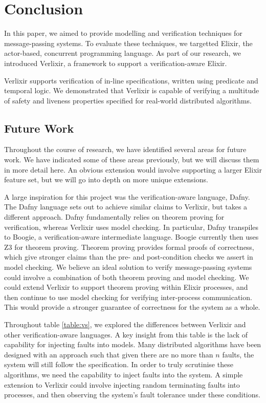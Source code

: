 \chapter{Conclusion}
In this paper, we aimed to provide modelling and verification techniques for message-passing systems. To evaluate these techniques, we targetted Elixir, the actor-based, concurrent programming language. As part of our research, we introduced Verlixir, a framework to support a verification-aware Elixir.
\par
Verlixir supports verification of in-line specifications, written using predicate and temporal logic. We demonstrated that Verlixir is capable of verifying a multitude of safety and liveness properties specified for real-world distributed algorithms. 
\section{Future Work}
Throughout the course of research, we have identified several areas for future work. We have indicated some of these areas previously, but we will discuss them in more detail here. An obvious extension would involve supporting a larger Elixir feature set, but we will go into depth on more unique extensions.
\par
A large inspiration for this project was the verification-aware language, Dafny. The Dafny language sets out to achieve similar claims to Verlixir, but takes a different approach. Dafny fundamentally relies on theorem proving for verification, whereas Verlixir uses model checking. In particular, Dafny transpiles to Boogie, a verification-aware intermediate language. Boogie currently then uses Z3 for theorem proving. Theorem proving provides formal proofs of correctness, which give stronger claims than the pre- and post-condition checks we assert in model checking. We believe an ideal solution to verify message-passing systems could involve a combination of both theorem proving and model checking. We could extend Verlixir to support theorem proving within Elixir processes, and then continue to use model checking for verifying inter-process communication. This would provide a stronger guarantee of correctness for the system as a whole.
\par
Throughout table \ref{table:vs}, we explored the differences between Verlixir and other verification-aware languages. A key insight from this table is the lack of capability for injecting faults into models. Many distributed algorithms have been designed with an approach such that given there are no more than $n$ faults, the system will still follow the specification. In order to truly scrutinise these algorithms, we need the capability to inject faults into the system. A simple extension to Verlixir could involve injecting random terminating faults into processes, and then observing the system's fault tolerance under these conditions.
